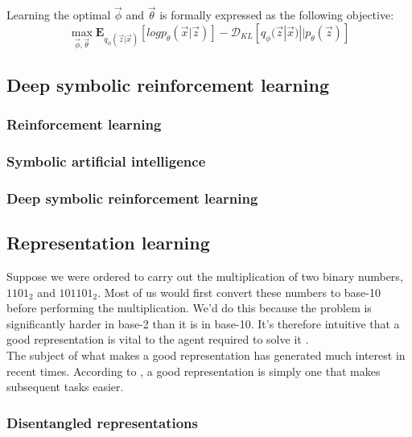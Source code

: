 \documentclass[12pt,twoside]{article}
\begin{document}
Learning the optimal $\vec{\phi}$ and $\vec{\theta}$ is formally expressed as the following objective:
\begin{equation}
\label{vae_objective}
\max_{\vec{\phi},\vec{\theta}}\mathbf{E}_{q_{\phi}(\vec{z}|\vec{x})}[log p_{\theta}(\vec{x}|\vec{z})] - \mathcal{D}_{KL}[q_{\phi}(\vec{z}|\vec{x})||p_{\theta}(\vec{z})]
\end{equation}


\subsection{Deep symbolic reinforcement learning}

\subsubsection{Reinforcement learning}

\subsubsection{Symbolic artificial intelligence}

\subsubsection{Deep symbolic reinforcement learning}

\subsection{Representation learning}

Suppose we were ordered to carry out the multiplication of two binary numbers, $1101_2$ and $101101_2$. Most of us would first convert these numbers to base-10 before performing the multiplication. We'd do this because the problem is significantly harder in base-2 than it is in base-10. It's therefore intuitive that a good representation is vital to the agent required to solve it \cite{IanGoodfellowYoshuaBengio2015}.\\

The subject of what makes a good representation has generated much interest in recent times. According to \cite{IanGoodfellowYoshuaBengio2015}, a good representation is simply one that makes subsequent tasks easier. 

\subsubsection{Disentangled representations}
\end{document}
